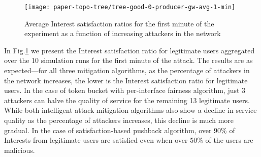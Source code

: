 
\begin{figure}[htbp]
  \centering
  \texttt{[image: paper-topo-tree/tree-good-0-producer-gw-avg-1-min]}
  \vspace{-.6cm}\caption{Average Interest satisfaction ratios for the first minute of the experiment as a function of increasing attackers in the network}\vspace{-.1cm}
  \label{fig:small-scale-topo boxplot}
\end{figure}

In Fig.\ref{fig:small-scale-topo boxplot} we present  the Interest satisfaction ratio for legitimate users aggregated over the 10 simulation runs for the first minute of the attack. The results are as expected---for all three mitigation algorithms, as the percentage of attackers in the network increases, the lower is the Interest satisfaction ratio for legitimate users.
In the case of token bucket with per-interface fairness algorithm, just 3 attackers can halve the quality of service for the remaining 13 legitimate users. While both intelligent attack mitigation algorithms also show a decline in service quality as the percentage of attackers increases, this decline is much more gradual. In the case of satisfaction-based pushback algorithm, over 90\% of Interests from legitimate users are satisfied even when over 50\% of the users are malicious.  
 




